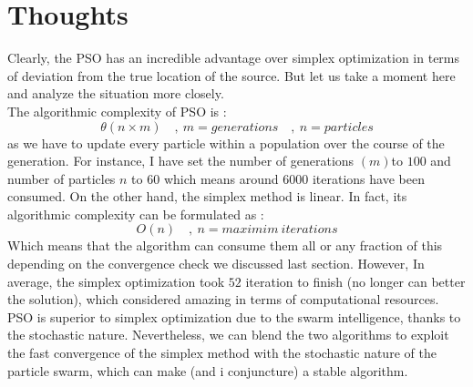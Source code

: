 \section{Thoughts}

Clearly, the PSO has an incredible advantage over simplex optimization
in terms of deviation from the true location of the source. But let us
take a moment here and analyze the situation more closely.\\
The algorithmic complexity of PSO is :\\
{\[\theta(n \times m)\quad,\ m = generations\quad,\ n = particles\]} as
we have to update every particle within a population over the course of
the generation. For instance, I have set the number of generations
{\((m)\)}to {\(100\)} and number of particles {\(n\)} to {\(60\)} which
means around {\(6000\)} iterations have been consumed. On the other
hand, the simplex method is linear. In fact, its algorithmic complexity
can be formulated as :\\
{\[O(n)\quad,\ n = maximim\ iterations\]}Which means that the algorithm
can consume them all or any fraction of this depending on the
convergence check we discussed last section. However, In average, the
simplex optimization took {\(52\)} iteration to finish (no longer can
better the solution), which considered amazing in terms of computational
resources.
PSO is superior to simplex optimization due to the swarm intelligence,
thanks to the stochastic nature. Nevertheless, we can blend the two
algorithms to exploit the fast convergence of the simplex method with
the stochastic nature of the particle swarm, which can make (and i
conjuncture) a stable algorithm.

